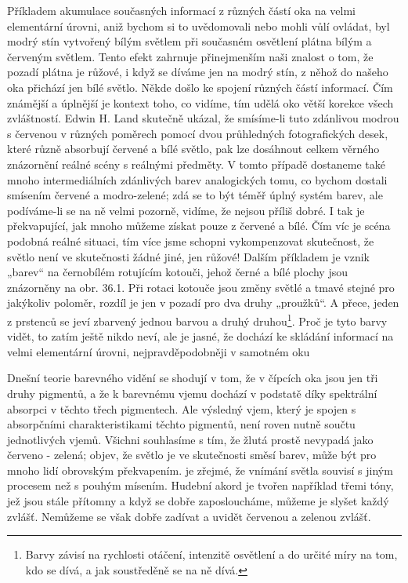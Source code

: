     Příkladem akumulace současných informací z různých částí oka na velmi elementární úrovni, aniž
    bychom si to uvědomovali nebo mohli vůlí ovládat, byl modrý stín vytvořený bílým světlem při
    současném osvětlení plátna bílým a červeným světlem. Tento efekt zahrnuje přinejmenším naši
    znalost o tom, že pozadí plátna je růžové, i když se díváme jen na modrý stín, z něhož do našeho
    oka přichází jen bílé světlo. Někde došlo ke spojení různých částí informací. Čím známější a
    úplnější je kontext toho, co vidíme, tím udělá oko větší korekce všech zvláštností. Edwin H.
    Land skutečně ukázal, že smísíme-li tuto zdánlivou modrou s červenou v různých poměrech pomocí
    dvou průhledných fotografických desek, které různě absorbují červené a bílé světlo, pak lze
    dosáhnout celkem věrného znázornění reálné scény s reálnými předměty. V tomto případě dostaneme
    také mnoho intermediálních zdánlivých barev analogických tomu, co bychom dostali smísením
    červené a modro-zelené; zdá se to být téměř úplný systém barev, ale podíváme-li se na ně velmi
    pozorně, vidíme, že nejsou příliš dobré. I tak je překvapující, jak mnoho můžeme získat pouze z
    červené a bílé. Čím víc je scéna podobná reálné situaci, tím více jsme schopni vykompenzovat
    skutečnost, že světlo není ve skutečnosti žádné jiné, jen růžové! Dalším příkladem je vznik
    „barev“ na černobílém rotujícím kotouči, jehož černé a bílé plochy jsou znázorněny na obr. 36.1.
    Při rotaci kotouče jsou změny světlé a tmavé stejné pro jakýkoliv poloměr, rozdíl je jen v
    pozadí pro dva druhy „proužků“. A přece, jeden z prstenců se jeví zbarvený jednou barvou a druhý
    druhou\footnote{Barvy závisí na rychlosti otáčení, intenzitě osvětlení a do určité míry na tom,
    kdo se dívá, a jak soustředěně se na ně dívá.}. Proč je tyto barvy vidět, to zatím ještě nikdo
    neví, ale je jasné, že dochází ke skládání informací na velmi elementární úrovni,
    nejpravděpodobněji v samotném oku

    Dnešní teorie barevného vidění se shodují v tom, že v čípcích oka jsou jen tři druhy pigmentů, a
    že k barevnému vjemu dochází v podstatě díky spektrální absorpci v těchto třech pigmentech. Ale
    výsledný vjem, který je spojen s absorpčními charakteristikami těchto pigmentů, není roven nutně
    součtu jednotlivých vjemů. Všichni souhlasíme s tím, že žlutá prostě nevypadá jako červeno -
    zelená; objev, že světlo je ve skutečnosti směsí barev, může být pro mnoho lidí obrovským
    překvapením. je zřejmé, že vnímání světla souvisí s jiným procesem než s pouhým mísením. Hudební
    akord je tvořen například třemi tóny, jež jsou stále přítomny a když se dobře zaposloucháme,
    můžeme je slyšet každý zvlášť. Nemůžeme se však dobře zadívat a uvidět červenou a zelenou
    zvlášť. 
    
